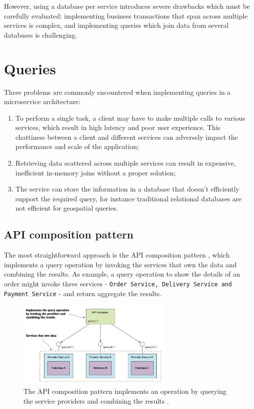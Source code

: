 \documentclass[conference]{IEEEtran}
\begin{document}
However, using a database per service introduces severe drawbacks which must be carefully evaluated: implementing business transactions that span across multiple services is complex, and implementing queries which join data from several databases is challenging.

\section{Queries}

Three problems are commonly encountered when implementing queries in a microservice architecture:

\begin{enumerate}
  \item To perform a single task, a client may have to make multiple calls to various  services, which result in high latency and poor user experience. This chattiness between a client and different services can adversely impact the performance and scale of the application;
  \item Retrieving data scattered across multiple services can result in expensive, inefficient in-memory joins without a proper solution;
  \item The service can store the information in a database that doesn't efficiently support the required query, for instance traditional relational databases are not efficient for geospatial queries.
\end{enumerate}

\subsection{API composition pattern}

The most straightforward approach is the API composition pattern \cite{microservices-patterns-api-composition}, which implements a query operation by invoking the services that own the data and combining the results. As example, a query operation to show the details of an order might invoke three services - \texttt{Order Service, Delivery Service and Payment Service} - and return aggregate the results.

\begin{figure}[!htbp]
\centering
\includegraphics[width=3in]{jpeg/api-composition}
\caption{The API composition pattern implements an operation by querying the service providers and combining the results \cite{microservices-patterns-api-composition}.}
\label{api-composition}
\end{figure}
\end{document}
